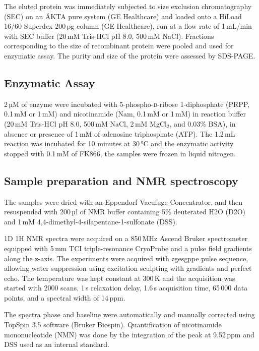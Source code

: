 The eluted protein was immediately subjected to size exclusion chromatography (SEC) on an ÄKTA pure system (GE Healthcare) and loaded onto a HiLoad 16/60 Superdex 200\,pg column (GE Healthcare), run at a flow rate of 1\,mL/min with SEC buffer (20\,mM Tris-HCl pH 8.0, 500\,mM NaCl). Fractions corresponding to the size of recombinant protein were pooled and used for enzymatic assay. The purity and size of the protein were assessed by SDS-PAGE.


\subsection{Enzymatic Assay}

2\,µM of enzyme were incubated with 5-phospho-\textsc{d}-ribose 1-diphosphate (PRPP, 0.1\,mM or 1\,mM) and nicotinamide (Nam, 0.1\,mM or 1\,mM) in reaction buffer (20\,mM Tris-HCl pH 8.0, 500\,mM NaCl, 2\,mM MgCl$_{2}$, and 0.03\% BSA), in absence or presence of 1\,mM of adenosine triphosphate (ATP). The 1.2\,mL reaction was incubated for 10 minutes at 30\,°C and the enzymatic activity stopped with 0.1\,mM of FK866, the samples were frozen in liquid nitrogen.


\subsection{Sample preparation and NMR spectroscopy}

The samples were dried with an Eppendorf Vacufuge Concentrator, and then resuspended with 200\,µl of NMR buffer containing 5\% deuterated H2O (D2O) and 1\,mM 4,4-dimethyl-4-silapentane-1-sulfonate (DSS).

1D 1H NMR spectra were acquired on a 850\,MHz Ascend Bruker spectrometer equipped with 5\,mm TCI triple-resonance CryoProbe and a pulse field gradients along the z-axis. The experiments were acquired with zgesgppe pulse sequence, allowing water suppression using excitation sculpting with gradients and perfect echo. The temperature was kept constant at 300\,K and the acquisition was started with 2000 scans, 1\,s relaxation delay, 1.6\,s acquisition time, 65\,000 data points, and a spectral width of 14\,ppm.

The spectra phase and baseline were automatically and manually corrected using TopSpin 3.5 software (Bruker Biospin). Quantification of nicotinamide mononucleotide (NMN) was done by the integration of the peak at 9.52\,ppm and DSS used as an internal standard.
